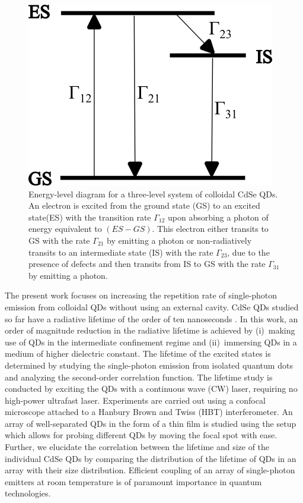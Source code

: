 \documentclass[%
 aip,
 amsmath,amssymb,
 reprint,%
]{revtex4-1}
\begin{document}
\begin{figure}
    \centering
    \includegraphics[width=0.55\linewidth]{energy level diagram.png}
    \caption{Energy-level diagram for a three-level system of colloidal CdSe QDs. An electron is excited from the ground state (GS) to an excited state(ES) with the transition rate \textbf{$\Gamma_{12}$} upon absorbing a photon of energy equivalent to $(ES-GS)$. This electron either transits  to  GS with the rate $\Gamma_{21}$ by emitting a photon or non-radiatively transits to an intermediate state (IS) with the rate $\Gamma_{23}$, due to the presence of defects and then transits from IS to GS with the rate $\Gamma_{31}$ by emitting a photon.}
    \label{fig: energy level diagram}
\end{figure}


The present work focuses on increasing the repetition rate of single-photon emission from colloidal QDs without using an external cavity. CdSe QDs studied so far have a radiative lifetime of the order of ten nanoseconds \cite{AAV}. In this work, an order of magnitude reduction in the radiative lifetime is achieved by (i)~making use of QDs in the intermediate confinement regime and (ii)~immersing QDs in a medium of higher dielectric constant. The lifetime of the excited states is determined by studying the single-photon emission from isolated quantum dots and analyzing the second-order correlation function. 
The lifetime study is conducted by exciting the QDs with a continuous wave (CW) laser, requiring no  high-power ultrafast laser. Experiments are carried out using a confocal microscope attached to a Hanbury Brown and Twiss (HBT) interferometer. An array of well-separated QDs in the form of a thin film is studied using the setup which allows for probing different QDs by moving the focal spot with ease. Further, we elucidate the correlation between the lifetime and size of the individual CdSe QDs by comparing the distribution of the lifetime of QDs in an array with their size distribution. Efficient coupling of an array of single-photon emitters at room temperature is of paramount importance in quantum technologies.
\end{document}
